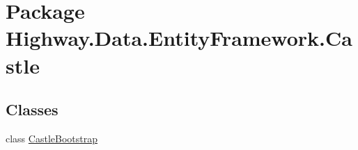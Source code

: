 \hypertarget{namespace_highway_1_1_data_1_1_entity_framework_1_1_castle}{\section{Package Highway.\-Data.\-Entity\-Framework.\-Castle}
\label{namespace_highway_1_1_data_1_1_entity_framework_1_1_castle}
}
\subsection*{Classes}
\begin{DoxyCompactItemize}
\item 
class \hyperlink{class_highway_1_1_data_1_1_entity_framework_1_1_castle_1_1_castle_bootstrap}{Castle\-Bootstrap}
\end{DoxyCompactItemize}
